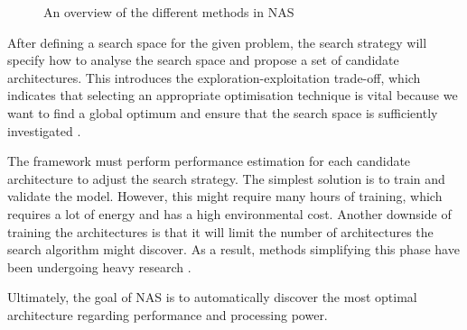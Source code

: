 \begin{figure}[h]
    \caption{An overview of the different methods in NAS \autocite{elsken2019neural} }
    \label{fig:nas_overview}
\end{figure}

After defining a search space for the given problem, the search strategy will specify how to analyse the search space and propose a set of candidate architectures. This introduces the exploration-exploitation trade-off, which indicates that selecting an appropriate optimisation technique is vital because we want to find a global optimum and ensure that the search space is sufficiently investigated \autocite{kyriakides2020introduction}. 

The framework must perform performance estimation for each candidate architecture to adjust the search strategy. The simplest solution is to train and validate the model. However, this might require many hours of training, which requires a lot of energy and has a high environmental cost. Another downside of training the architectures is that it will limit the number of architectures the search algorithm might discover. As a result, methods simplifying this phase have been undergoing heavy research \autocite{elsken2019neural}. 

Ultimately, the goal of NAS is to automatically discover the most optimal architecture regarding performance and processing power. 




